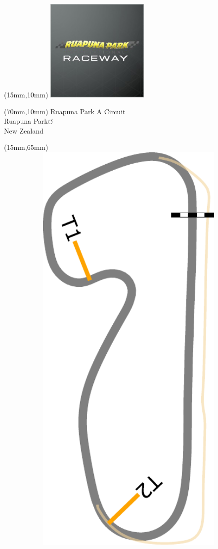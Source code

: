 \null\newpage
\begin{textblock*}{50mm}(15mm,10mm)%
\includegraphics[width=50mm]{LG/RUPU.png}
\end{textblock*}
\begin{textblock*}{130mm}(70mm,10mm)%
{\fontsize{20}{20}\selectfont Ruapuna Park A Circuit\\}
{\fontsize{16}{16}\selectfont Ruapuna Park\hfill \Large$\circlearrowleft$\\}
{\fontsize{12}{12}\selectfont New Zealand\\}
\end{textblock*}
\begin{textblock*}{185mm}(15mm,65mm)%
\centering
\mbox{\includegraphics[width=185mm,height=210mm,keepaspectratio]{PT/RPAC.pdf}}
\end{textblock*}
